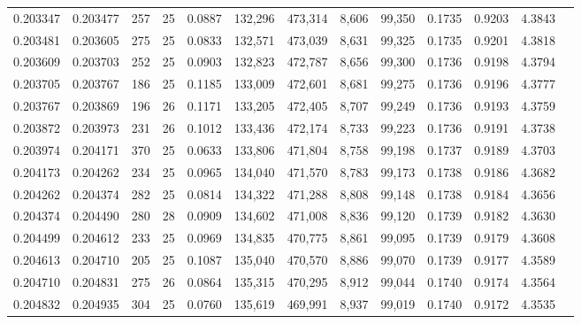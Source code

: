 \begin{tabular}{rrrrrrrrrrrrr}
0.203347 & 0.203477 &   257 &  25 &                                     0.0887 & 132,296 & 473,314 &   8,606 &  99,350 & 0.1735 & 0.9203 & 4.3843 \\
0.203481 & 0.203605 &   275 &  25 &                                     0.0833 & 132,571 & 473,039 &   8,631 &  99,325 & 0.1735 & 0.9201 & 4.3818 \\
0.203609 & 0.203703 &   252 &  25 &                                     0.0903 & 132,823 & 472,787 &   8,656 &  99,300 & 0.1736 & 0.9198 & 4.3794 \\
0.203705 & 0.203767 &   186 &  25 &                                     0.1185 & 133,009 & 472,601 &   8,681 &  99,275 & 0.1736 & 0.9196 & 4.3777 \\
0.203767 & 0.203869 &   196 &  26 &                                     0.1171 & 133,205 & 472,405 &   8,707 &  99,249 & 0.1736 & 0.9193 & 4.3759 \\
0.203872 & 0.203973 &   231 &  26 &                                     0.1012 & 133,436 & 472,174 &   8,733 &  99,223 & 0.1736 & 0.9191 & 4.3738 \\
0.203974 & 0.204171 &   370 &  25 &                                     0.0633 & 133,806 & 471,804 &   8,758 &  99,198 & 0.1737 & 0.9189 & 4.3703 \\
0.204173 & 0.204262 &   234 &  25 &                                     0.0965 & 134,040 & 471,570 &   8,783 &  99,173 & 0.1738 & 0.9186 & 4.3682 \\
0.204262 & 0.204374 &   282 &  25 &                                     0.0814 & 134,322 & 471,288 &   8,808 &  99,148 & 0.1738 & 0.9184 & 4.3656 \\
0.204374 & 0.204490 &   280 &  28 &                                     0.0909 & 134,602 & 471,008 &   8,836 &  99,120 & 0.1739 & 0.9182 & 4.3630 \\
0.204499 & 0.204612 &   233 &  25 &                                     0.0969 & 134,835 & 470,775 &   8,861 &  99,095 & 0.1739 & 0.9179 & 4.3608 \\
0.204613 & 0.204710 &   205 &  25 &                                     0.1087 & 135,040 & 470,570 &   8,886 &  99,070 & 0.1739 & 0.9177 & 4.3589 \\
0.204710 & 0.204831 &   275 &  26 &                                     0.0864 & 135,315 & 470,295 &   8,912 &  99,044 & 0.1740 & 0.9174 & 4.3564 \\
0.204832 & 0.204935 &   304 &  25 &                                     0.0760 & 135,619 & 469,991 &   8,937 &  99,019 & 0.1740 & 0.9172 & 4.3535 \\

\end{tabular}
